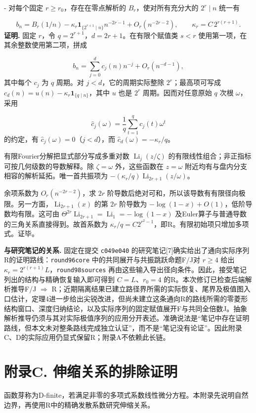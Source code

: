 \documentclass[UTF8,11pt,fontset=fandol]{ctexart}
\begin{document}
- 对每个固定 $r\ge r_0$，存在在零点解析的 $B_r$，使对所有充分大的 $2^r\mid n$ 统一有

\[
b_n=B_r(1/n)-\kappa_r\mathbf1_{\{2^{r+1}\mid n\}}n^{-2r-1}+O_r(n^{-2r-2}),\qquad \kappa_r=C\,2^{r(r+1)}.
\]
\textbf{证明.} 固定 $r$，令 $q=2^{r+1}$，$d=2r+1$。在有限个赋值类 $s<r$ 使用第一项，在其余整数使用第二项，拼成

\[
b_n=\sum_{j=0}^{d}c_j(n)n^{-j}+O_r(n^{-d-1}),
\]
其中每个 $c_j$ 为 $q$ 周期。对 $j<d$，它的周期实际整除 $2^r$；最高项可写成 $c_d(n)=u(n)-\kappa_r\mathbf1_{\{q\mid n\}}$，其中 $u$ 也是 $2^r$ 周期。因而对任意原始 $q$ 次根 $\omega$，采用

\[
\widehat c_j(\omega)=\frac1q\sum_{t=1}^{q}c_j(t)\omega^t
\]
的约定，有 $\widehat c_j(\omega)=0$（$j<d$），而 $\widehat c_d(\omega)=-\kappa_r/q$。

有限Fourier分解把显式部分写成多重对数 $\operatorname{Li}_j(z/\zeta)$ 的有限线性组合；非正指标可按几何级数的导数解释。除 $\zeta=\omega$ 外，这些函数在 $z=\omega$ 附近均有与盘内分支相容的解析延拓。唯一首共振项为 $-(\kappa_r/q)\operatorname{Li}_{2r+1}(z/\omega)$。

余项系数为 $O_r(n^{-2r-2})$，求 $2r$ 阶导数后绝对可和，所以该导数有有限径向极限。另一方面，$\operatorname{Li}_{2r+1}(x)$ 的第 $2r$ 阶导数为 $-\log(1-x)+O(1)$，低阶导数均有限。这可由 $\Theta^{2r}\operatorname{Li}_{2r+1}=\operatorname{Li}_1=-\log(1-x)$ 及Euler算子与普通导数的三角关系直接得到。故首系数为 $\kappa_r/q=C2^{r^2-1}$，即R。有限初始项只增加多项式。证毕。

\textbf{与研究笔记的关系.} 固定在提交 \texttt{c049e040} 的研究笔记[7]确实给出了通向实际序列R的证明路线：\texttt{round96core} 中的共同展开与共振跳跃命题F/J对 $r\ge4$ 给出 $\kappa_r=2^{r(r+1)}L$，\texttt{round98sources} 再由这些输入导出径向条件。因此，接受笔记列出的结构与精确恢复输入即可得到 $C=L$、$r_0=4$ 的R。本次修订已检查后端解析推导F/J $\Rightarrow$ R；近期隔离结果已建立路径界所需的实际恢复、尾界及极值图入口估计，定理4进一步给出尖锐改进，但尚未建立这条通向R的路线所需的零菱形结构窗口、深度归纳结论，以及实际序列的固定赋值展开F与共同全倍数J。抽象解析推导仍须与其对实际极值序列的应用分开表述。准确说法是“笔记中存在证明路线，但本文未对整条路线完成独立认证”，而不是“笔记没有论证”。因此附录C、D的实际应用仍显式保留R；附录A不依赖此长链。

\section*{附录C. 伸缩关系的排除证明}
函数芽称为D-finite，若满足非零的多项式系数线性微分方程。本附录先说明自然边界，再使用R中的精确发散系数研究伸缩关系。
\end{document}
